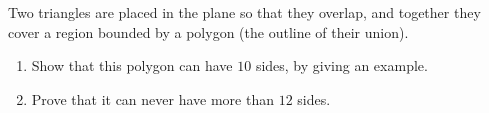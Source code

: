 Two triangles are placed in the plane so that they overlap, and together they cover a region bounded by a polygon (the outline of their union).
\begin{enumerate}
\item[(a)] Show that this polygon can have $10$ sides, by giving an example.
\item[(b)] Prove that it can never have more than $12$ sides.
\end{enumerate}
